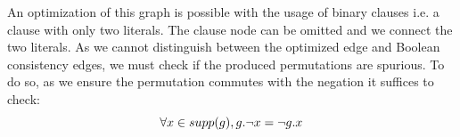 %
%
%
%

An optimization of this graph is possible with the usage of binary clauses i.e. a clause with only two literals.
The clause node can be omitted and we connect the two literals. As we cannot distinguish between the optimized edge 
and Boolean consistency edges, we must check if the produced permutations are spurious. 
To do so, as we ensure the permutation commutes with the negation it suffices to check:
$$\forall x \in supp(g), g.\neg x = \neg g.x$$

